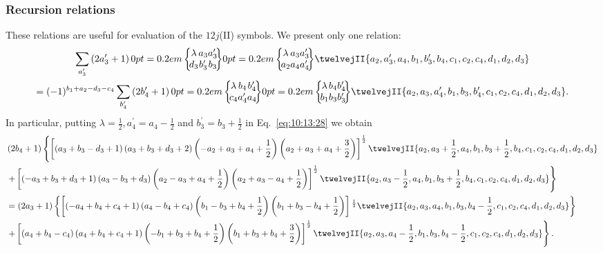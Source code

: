 \subsubsection{Recursion relations}
These relations are useful for evaluation of the $12j$(II) symbols. We present only one relation:
\begin{gather}
\sum_{a_{3}^{\prime}}\left(2 a_{3}^{\prime}+1\right)\sixj{\lambda}{a_{3}}{a_{3}^{\prime}}{d_{3}}{b_{3}^{\prime}}{b_{3}}\sixj{\lambda}{a_{3}}{a_{3}^{\prime}}{a_{2}}{a_{4}}{a_{4}^{\prime}}\twelvejII{a_{2},a_{3}^{\prime},a_{4},b_{1},b_{3}^{\prime},b_{4},c_{1},c_{2},c_{4},d_{1},d_{2},d_{3}}  \notag\\
=(-1)^{b_{1}+a_{2}-d_{3}-c_{4}} \sum_{b_{4}^{\prime}}\left(2 b_{4}^{\prime}+1\right)\sixj{\lambda}{b_{4}}{b_{4}^{\prime}}{c_{4}}{a_{4}^{\prime}}{a_{4}}\sixj{\lambda}{b_{4}}{b_{4}^{\prime}}{b_{1}}{b_{3}}{b_{3}^{\prime}}\twelvejII{a_{2},a_{3},a_{4}^{\prime},b_{1},b_{3},b_{4}^{\prime},c_{1},c_{2},c_{4},d_{1},d_{2},d_{3}} . \label{eq:10:13:28}
\end{gather}
In particular, putting $\lambda=\frac{1}{2}, a_{4}^{\prime}=a_{4}-\frac{1}{2}$ and $b_{3}^{\prime}=b_{3}+\frac{1}{2}$ in Eq.~\eqref{eq:10:13:28} we obtain
\begin{align}
& \left(2 b_{4}+1\right)\left\{\left[\left(a_{3}+b_{3}-d_{3}+1\right)\left(a_{3}+b_{3}+d_{3}+2\right)\left(-a_{2}+a_{3}+a_{4}+\frac{1}{2}\right)\left(a_{2}+a_{3}+a_{4}+\frac{3}{2}\right)\right]^{\frac{1}{2}}\twelvejII{a_{2},a_{3}+\frac{1}{2},a_{4},b_{1},b_{3}+\frac{1}{2},b_{4},c_{1},c_{2},c_{4},d_{1},d_{2},d_{3}}\right. \notag \\
& \left.+\left[\left(-a_{3}+b_{3}+d_{3}+1\right)\left(a_{3}-b_{3}+d_{3}\right)\left(a_{2}-a_{3}+a_{4}+\frac{1}{2}\right)\left(a_{2}+a_{3}-a_{4}+\frac{1}{2}\right)\right]^{\frac{1}{2}}\twelvejII{a_{2},a_{3}-\frac{1}{2},a_{4},b_{1},b_{3}+\frac{1}{2},b_{4},c_{1},c_{2},c_{4},d_{1},d_{2},d_{3}}\right\} \notag \\
& =\left(2 a_{3}+1\right)\left\{\left[\left(-a_{4}+b_{4}+c_{4}+1\right)\left(a_{4}-b_{4}+c_{4}\right)\left(b_{1}-b_{3}+b_{4}+\frac{1}{2}\right)\left(b_{1}+b_{3}-b_{4}+\frac{1}{2}\right)\right]{ }^{\frac{1}{2}}\twelvejII{a_{2},a_{3},a_{4},b_{1},b_{3},b_{4}-\frac{1}{2},c_{1},c_{2},c_{4},d_{1},d_{2},d_{3}}\right\} \notag \\
& \left.+\left[\left(a_{4}+b_{4}-c_{4}\right)\left(a_{4}+b_{4}+c_{4}+1\right)\left(-b_{1}+b_{3}+b_{4}+\frac{1}{2}\right)\left(b_{1}+b_{3}+b_{4}+\frac{3}{2}\right)\right]^{\frac{1}{2}}\twelvejII{a_{2},a_{3},a_{4}-\frac{1}{2},b_{1},b_{3},b_{4}-\frac{1}{2},c_{1},c_{2},c_{4},d_{1},d_{2},d_{3}}\right\} .
\end{align}

